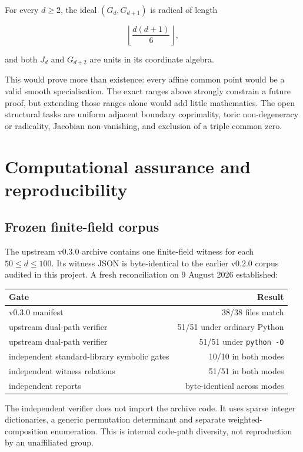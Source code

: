\documentclass[
]{article}
\newcounter{none} %
\begin{document}
For every \(d\ge2\), the ideal \((G_d,G_{d+1})\) is radical of length

\[
\left\lfloor\frac{d(d+1)}6\right\rfloor,
\]

and both \(J_d\) and \(G_{d+2}\) are units in its coordinate algebra.

This would prove more than existence: every affine common point would be
a valid smooth specialisation. The exact ranges above strongly constrain
a future proof, but extending those ranges alone would add little
mathematics. The open structural tasks are uniform adjacent boundary
coprimality, toric non-degeneracy or radicality, Jacobian non-vanishing,
and exclusion of a triple common zero.

\section{Computational assurance and
reproducibility}\label{computational-assurance-and-reproducibility}

\subsection{Frozen finite-field
corpus}\label{frozen-finite-field-corpus}

The upstream v0.3.0 archive contains one finite-field witness for each
\(50\le d\le100\). Its witness JSON is byte-identical to the earlier
v0.2.0 corpus audited in this project. A fresh reconciliation on 9
August 2026 established:

{\def\LTcaptype{none} %
\begin{longtable}[]{@{}lr@{}}
\toprule\noalign{}
Gate & Result \\
\midrule\noalign{}
\endhead
\bottomrule\noalign{}
\endlastfoot
v0.3.0 manifest & 38/38 files match \\
upstream dual-path verifier & 51/51 under ordinary Python \\
upstream dual-path verifier & 51/51 under \texttt{python\ -O} \\
independent standard-library symbolic gates & 10/10 in both modes \\
independent witness relations & 51/51 in both modes \\
independent reports & byte-identical across modes \\
\end{longtable}
}

The independent verifier does not import the archive code. It uses
sparse integer dictionaries, a generic permutation determinant and
separate weighted-composition enumeration. This is internal code-path
diversity, not reproduction by an unaffiliated group.
\end{document}
